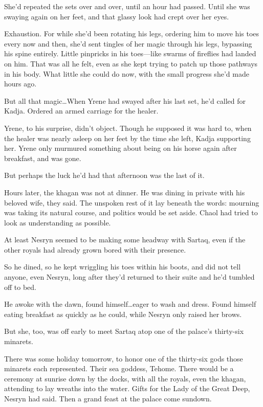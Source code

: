 She'd repeated the sets over and over, until an hour had passed.
Until she was swaying again on her feet, and that glassy look had crept over her eyes.

Exhaustion.
For while she'd been rotating his legs, ordering him to move his toes every now and then, she'd sent tingles of her magic through his legs, bypassing his spine entirely.
Little pinpricks in his toes---like swarms of fireflies had landed on him.
That was all he felt, even as she kept trying to patch up those pathways in his body.
What little she could do now, with the small progress she'd made hours ago.

But all that magic\ldots When Yrene had swayed after his last set, he'd called for Kadja.
Ordered an armed carriage for the healer.

Yrene, to his surprise, didn't object.
Though he supposed it was hard to, when the healer was nearly asleep on her feet by the time she left, Kadja supporting her.
Yrene only murmured something about being on his horse again after breakfast, and was gone.

But perhaps the luck he'd had that afternoon was the last of it.

Hours later, the khagan was not at dinner.
He was dining in private with his beloved wife, they said.
The unspoken rest of it lay beneath the words: mourning was taking its natural course, and politics would be set aside.
Chaol had tried to look as understanding as possible.

At least Nesryn seemed to be making some headway with Sartaq, even if the other royals had already grown bored with their presence.

So he dined, so he kept wriggling his toes within his boots, and did not tell anyone, even Nesryn, long after they'd returned to their suite and he'd tumbled off to bed.

He awoke with the dawn, found himself\ldots eager to wash and dress.
Found himself eating breakfast as quickly as he could, while Nesryn only raised her brows.

But she, too, was off early to meet Sartaq atop one of the palace's thirty-six minarets.

There was some holiday tomorrow, to honor one of the thirty-six gods those minarets each represented.
Their sea goddess, Tehome.
There would be a ceremony at sunrise down by the docks, with all the royals, even the khagan, attending to lay wreaths into the water.
Gifts for the Lady of the Great Deep, Nesryn had said.
Then a grand feast at the palace come sundown.

